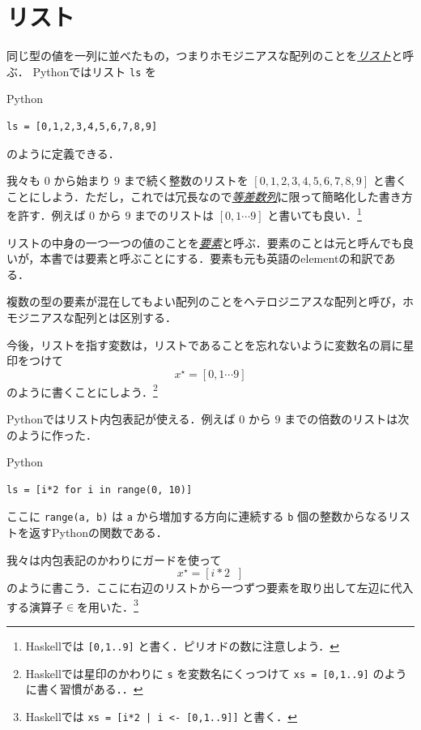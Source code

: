 \documentclass[a4paper]{jsbook}
\newcommand{\programminglanguage}[1]{\textsf{#1}}
\newcommand{\haskell}{\programminglanguage{Haskell}}
\newcommand{\python}{\programminglanguage{Python}}
\newcommand{\keyword}[1]{{\underline{\emph{#1}}}}
\newcommand{\code}[1]{\texttt{#1}}
\newenvironment{pythoncode}{\begin{itembox}[r]{\python}}{\end{itembox}}
\newcommand{\mListWith}[1]{\left[#1\right]}
\newcommand{\mList}[1]{{#1}^\mathrm{\star}}
\newcommand{\mGuard}[1]{\mathop{\mid_{#1}}}
\DeclareMathOperator{\mFrom}{\in}
\begin{document}
\section{リスト}

同じ型の値を一列に並べたもの，つまりホモジニアスな配列のことを\keyword{リスト}と呼ぶ．
\python ではリスト \code{ls} を
\begin{pythoncode}
\begin{verbatim}
ls = [0,1,2,3,4,5,6,7,8,9]
\end{verbatim}
\end{pythoncode}
のように定義できる．

我々も $0$ から始まり $9$ まで続く整数のリストを $[0,1,2,3,4,5,6,7,8,9]$ と書くことにしよう．ただし，これでは冗長なので\keyword{等差数列}に限って簡略化した書き方を許す．例えば $0$ から $9$ までのリストは $\mListWith{0,1\dotsb9}$ と書いても良い．\footnote{\haskell では \code{[0,1..9]} と書く．ピリオドの数に注意しよう．}

リストの中身の一つ一つの値のことを\keyword{要素}と呼ぶ．要素のことは元と呼んでも良いが，本書では要素と呼ぶことにする．要素も元も英語のelementの和訳である．

複数の型の要素が混在してもよい配列のことをヘテロジニアスな配列と呼び，ホモジニアスな配列とは区別する．

今後，リストを指す変数は，リストであることを忘れないように変数名の肩に星印をつけて
\begin{equation}
\mList{x}=\mListWith{0,1\dotsb9}
\end{equation}
のように書くことにしよう．\footnote{\haskell では星印のかわりに \code{s} を変数名にくっつけて \code{xs = [0,1..9]} のように書く習慣がある．．}

\python ではリスト内包表記が使える．例えば $0$ から $9$ までの倍数のリストは次のように作った．
\begin{pythoncode}
\begin{verbatim}
ls = [i*2 for i in range(0, 10)]
\end{verbatim}
\end{pythoncode}
ここに \code{range(a, b)} は \code{a} から増加する方向に連続する \code{b} 個の整数からなるリストを返す\python の関数である．

我々は内包表記のかわりにガードを使って
\begin{equation}
\mList{x}=\mListWith{i*2\mGuard{i\mFrom{\mListWith{0,1\dotsb9}}}}
\end{equation}
のように書こう．ここに右辺のリストから一つずつ要素を取り出して左辺に代入する演算子$\mFrom$を用いた．\footnote{\haskell では \code{xs = [i*2 | i <- [0,1..9]]} と書く．}
\end{document}
